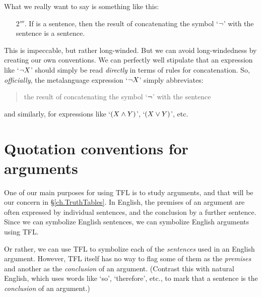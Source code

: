 What we really want to say is something like this:
	\begin{itemize}
		\item[2$'''$.] If \metaX is a sentence, then the result of concatenating the symbol `$\neg$' with the sentence \metaX is a sentence.
	\end{itemize}
This is impeccable, but rather long-winded. %
But we can avoid long-windedness by creating our own conventions. We can perfectly well stipulate that an expression like `$\neg X$' should simply be read \emph{directly} in terms of rules for concatenation. So, \emph{officially}, the metalanguage expression `$\neg X$'
simply abbreviates:
\begin{quote}
	the result of concatenating the symbol `$\neg$' with the sentence \metaX
\end{quote}
and similarly, for expressions like `$(X \mathbin{\wedge} Y)$', `$(X \vee Y)$', etc.


\section{Quotation conventions for arguments}
One of our main purposes for using TFL is to study arguments, and that will be our concern in \S\ref{ch.TruthTables}. In English, the premises of an argument are often expressed by individual sentences, and the conclusion by a further sentence. Since we can symbolize English sentences, we can symbolize English arguments using TFL.

Or rather, we can use TFL to symbolize each of the \emph{sentences} used in an English argument. However, TFL itself has no way to flag some of them as the \emph{premises} and another as the \emph{conclusion} of an argument.  (Contrast this with natural English, which uses words like `so', `therefore', etc., to mark that a sentence is the \emph{conclusion} of an argument.)


